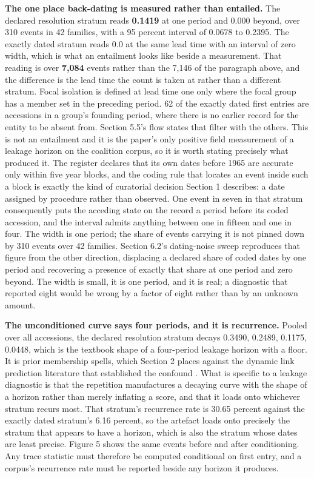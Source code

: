 \documentclass[twoside,11pt]{article}
\begin{document}
\textbf{The one place back-dating is measured rather than entailed.} The declared resolution stratum reads \textbf{0.1419} at one period and 0.000 beyond, over 310 events in 42 families, with a 95 percent interval of 0.0678 to 0.2395. The exactly dated stratum reads 0.0 at the same lead time with an interval of zero width, which is what an entailment looks like beside a measurement. That reading is over \textbf{7,084} events rather than the 7,146 of the paragraph above, and the difference is the lead time the count is taken at rather than a different stratum. Focal isolation is defined at lead time one only where the focal group has a member set in the preceding period. 62 of the exactly dated first entries are accessions in a group's founding period, where there is no earlier record for the entity to be absent from. Section 5.5's flow states that filter with the others. This is not an entailment and it is the paper's only positive field measurement of a leakage horizon on the coalition corpus, so it is worth stating precisely what produced it. The register declares that its own dates before 1965 are accurate only within five year blocks, and the coding rule that locates an event inside such a block is exactly the kind of curatorial decision Section 1 describes: a date assigned by procedure rather than observed. One event in seven in that stratum consequently puts the acceding state on the record a period before its coded accession, and the interval admits anything between one in fifteen and one in four. The width is one period; the share of events carrying it is not pinned down by 310 events over 42 families. Section 6.2's dating-noise sweep reproduces that figure from the other direction, displacing a declared share of coded dates by one period and recovering a presence of exactly that share at one period and zero beyond. The width is small, it is one period, and it is real; a diagnostic that reported eight would be wrong by a factor of eight rather than by an unknown amount.

\textbf{The unconditioned curve says four periods, and it is recurrence.} Pooled over all accessions, the declared resolution stratum decays 0.3490, 0.2489, 0.1175, 0.0448, which is the textbook shape of a four-period leakage horizon with a floor. It is prior membership spells, which Section 2 places against the dynamic link prediction literature that established the confound \citep{poursafaei}. What is specific to a leakage diagnostic is that the repetition manufactures a decaying curve with the shape of a horizon rather than merely inflating a score, and that it loads onto whichever stratum recurs most. That stratum's recurrence rate is 30.65 percent against the exactly dated stratum's 6.16 percent, so the artefact loads onto precisely the stratum that appears to have a horizon, which is also the stratum whose dates are least precise. Figure 5 shows the same events before and after conditioning. Any trace statistic must therefore be computed conditional on first entry, and a corpus's recurrence rate must be reported beside any horizon it produces.
\end{document}

